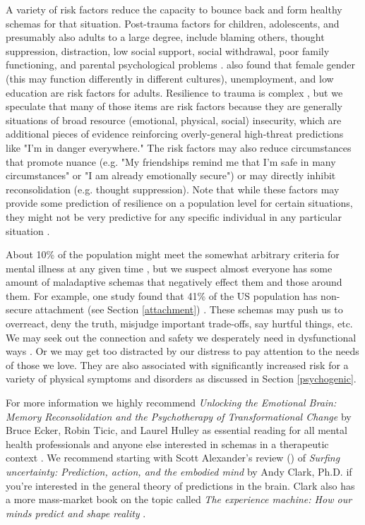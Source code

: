 \documentclass[12pt,letterpaper]{book}
\begin{document}
A variety of risk factors reduce the capacity to bounce back and form healthy schemas for that situation. Post-trauma factors for children, adolescents, and presumably also adults to a large degree, include blaming others, thought suppression, distraction, low social support, social withdrawal, poor family functioning, and parental psychological problems \cite{trickeyRiskFactors}. \cite{tangRiskFactors} also found that female gender (this may function differently in different cultures), unemployment, and low education are risk factors for adults. Resilience to trauma is complex \cite{bonanno2008loss}, but we speculate that many of those items are risk factors because they are generally situations of broad resource (emotional, physical, social) insecurity, which are additional pieces of evidence reinforcing overly-general high-threat predictions like "I'm in danger everywhere." The risk factors may also reduce circumstances that promote nuance (e.g. "My friendships remind me that I'm safe in many circumstances" or "I am already emotionally secure") or may directly inhibit reconsolidation (e.g. thought suppression). Note that while these factors may provide some prediction of resilience on a population level for certain situations, they might not be very predictive for any specific individual in any particular situation \cite{bonannoRelilienceParadox}.

About 10\% of the population might meet the somewhat arbitrary criteria for mental illness at any given time \cite{whoMentalHealth}, but we suspect almost everyone has some amount of maladaptive schemas that negatively effect them and those around them. For example, one study found that 41\% of the US population has non-secure attachment (see Section \ref{attachment}) \cite{mickelson1997adult}. These schemas may push us to overreact, deny the truth, misjudge important trade-offs, say hurtful things, etc. We may seek out the connection and safety we desperately need in dysfunctional ways \cite{brownAttachmentDisturbances}. Or we may get too distracted by our distress to pay attention to the needs of those we love. They are also associated with significantly increased risk for a variety of physical symptoms and disorders as discussed in Section \ref{psychogenic}.

For more information we highly recommend \textit{Unlocking the Emotional Brain: Memory Reconsolidation and the Psychotherapy of Transformational Change} by Bruce Ecker, Robin Ticic, and Laurel Hulley as essential reading for all mental health professionals and anyone else interested in schemas in a therapeutic context \cite{eckerUnlocking}. We recommend starting with Scott Alexander's review (\textcite{clark2015surfing}) of \textit{Surfing uncertainty: Prediction, action, and the embodied mind} by Andy Clark, Ph.D. if you're interested in the general theory of predictions in the brain. Clark also has a more mass-market book on the topic called \textit{The experience machine: How our minds predict and shape reality} \cite{clark2024experience}.
\end{document}
